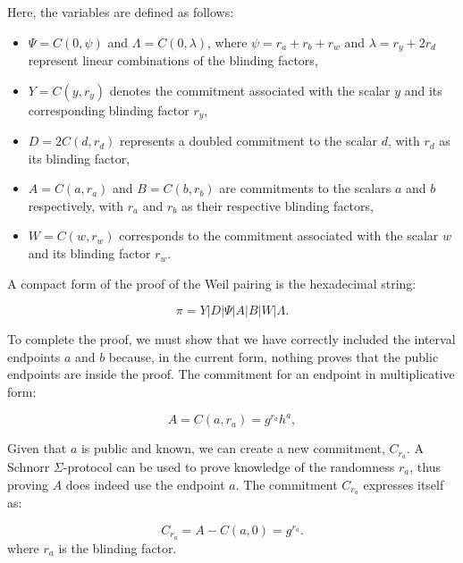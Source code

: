 \documentclass{iacrcc}
\theoremstyle{definition}
\begin{document}
Here, the variables are defined as follows:

\begin{itemize}
    \item \( \Psi = C(0, \psi) \) and \( \Lambda = C(0, \lambda) \), where \( \psi = r_{a} + r_{b} + r_{w} \) and \( \lambda = r_{y} + 2r_{d} \) represent linear combinations of the blinding factors,
    \item \( Y = C(y, r_{y}) \) denotes the commitment associated with the scalar \( y \) and its corresponding blinding factor \( r_{y} \),
    \item \( D = 2C(d, r_{d}) \) represents a doubled commitment to the scalar \( d \), with \( r_{d} \) as its blinding factor,
    \item \( A = C(a, r_{a}) \) and \( B = C(b, r_{b}) \) are commitments to the scalars \( a \) and \( b \) respectively, with \( r_{a} \) and \( r_{b} \) as their respective blinding factors,
    \item \( W = C(w, r_{w}) \) corresponds to the commitment associated with the scalar \( w \) and its blinding factor \( r_{w} \).
\end{itemize}

A compact form of the proof of the Weil pairing is the hexadecimal string:

\begin{equation}
\pi = Y | D | \Psi | A | B | W | \Lambda.
\end{equation}

To complete the proof, we must show that we have correctly included the interval endpoints \( a \) and \( b \) because, in the current form, nothing proves that the public endpoints are inside the proof. The commitment for an endpoint in multiplicative form:

\begin{equation}
A = C(a, r_{a}) = g^{r_{a}} h^{a},
\end{equation}

Given that \( a \) is public and known, we can create a new commitment, \( C_{r_a} \). A Schnorr $\Sigma$-protocol can be used to prove knowledge of the randomness \( r_a \), thus proving $A$ does indeed use the endpoint \(a\). The commitment \( C_{r_a} \) expresses itself as:

\begin{equation}
C_{r_a} = A - C(a, 0) = g^{r_{a}}.
\end{equation}
where \( r_{a} \) is the blinding factor. 
\end{document}
